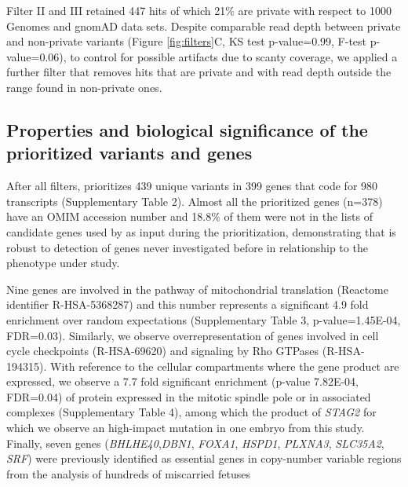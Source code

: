 Filter II and III retained 447 hits of which 21\% are private with respect to 1000 Genomes and gnomAD data sets. Despite comparable read depth between private and non-private variants (Figure \ref{fig:filters}C, KS test p-value=0.99, F-test p-value=0.06), to control for possible artifacts due to scanty coverage, we applied a further filter that removes hits that are private and with read depth outside the range found in non-private ones.  

\subsection*{Properties and biological significance of the prioritized variants and genes} 

After all filters, \gp prioritizes 439 unique variants in 399 genes that code for 980 transcripts (Supplementary Table 2). %
Almost all the prioritized genes (n=378) have an OMIM accession number and 18.8\% of them were not in the lists of candidate genes used by \gp as input during the prioritization, demonstrating that \gp is robust to detection of genes never investigated before in relationship to the phenotype under study. 

Nine genes are involved in the pathway of mitochondrial translation (Reactome identifier R-HSA-5368287) and this number represents a significant 4.9 fold enrichment over random expectations (Supplementary Table 3, p-value=1.45E-04, FDR=0.03). Similarly, we observe overrepresentation of genes involved in cell cycle checkpoints (R-HSA-69620) and signaling by Rho GTPases (R-HSA-194315). With reference to the cellular compartments where the gene product are expressed, we observe a 7.7 fold significant enrichment (p-value 7.82E-04, FDR=0.04) of protein expressed in the mitotic spindle pole or in associated complexes (Supplementary Table 4), among which the product of \textit{STAG2} for which we observe an high-impact mutation in one embryo from this study. Finally, seven genes (\textit{BHLHE40},\textit{DBN1}, \textit{FOXA1}, \textit{HSPD1}, \textit{PLXNA3}, \textit{SLC35A2}, \textit{SRF}) were previously identified as essential genes in copy-number variable regions from the analysis of hundreds of miscarried fetuses \cite{chen2017characterization} %

